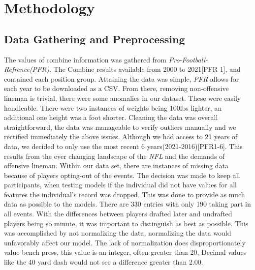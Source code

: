 \documentclass[confrence]{IEEEtran}
\begin{document}
\section*{Methodology}
\subsection*{Data Gathering and Preprocessing}
The values of combine information was gathered from \textit{Pro-Football-Refrence(PFR)}.
The Combine results available from 2000 to 2021[PFR 1], and contained each position group.
Attaining the data was simple, \textit{PFR} allows for each year to be downloaded as a CSV.
From there, removing non-offensive lineman is trivial, there were some anomalies in our dataset.
These were easily handleable. There were two instances of weights being 100lbs lighter, an additional one height was a foot shorter.
Cleaning the data was overall straightforward, the data was manageable to verify outliers manually and we rectified immediately the above issues.
Although we had access to 21 years of data, we decided to only use the most recent 6 years(2021-2016)[PFR1-6]. This results from the ever changing landscape of the \textit{NFL} and the demands of offensive lineman.
Within our data set, there are instances of missing data because of players opting-out of the events.
The decision was made to keep all participants, when testing models if the individual did not have values for all features the individual's record was dropped.
This was done to provide as much data as possible to the models. There are 330 entries with only 190 taking part in all events.
With the differences between players drafted later and undrafted players being so minute, it was important to distinguish as best as possible.
This was accomplished by not normalizing the data, normalizing the data would unfavorably affect our model.
The lack of normalization does disproportionately value bench press, this value is an integer, often greater than 20, Decimal values like the 40 yard dash would not see a difference greater than 2.00.
\end{document}
